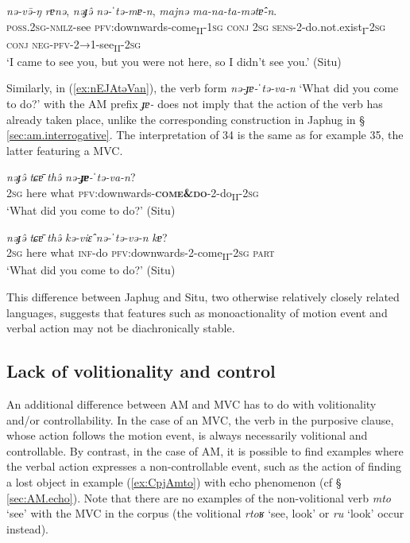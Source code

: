 \documentclass[oneside,a4paper,11pt]{article}
\newcommand{\ipa}[1]{{\phon\textit{#1}}}
\newcommand{\japhug}[2]{\textit{\phon#1} `#2'}
\newcommand{\sens}[1]{‘#1’}
\newcommand{\rouge}[1]{\textbf{#1}}
\begin{document}
\begin{exe}
\ex  \label{ex:nEkEnatso}
\gll \ipa{nə-kə-natsō} \ipa{nə-və̄-ŋ} \ipa{rɐnə}, \ipa{nəɟə̂} \ipa{nə-ˈtə-mɐ-n}, \ipa{majnə} \ipa{ma-na-ta-mətɐ̂-n}.\\
\textsc{poss.2sg}-\textsc{nmlz}-see \textsc{pfv}:downwards-come\textsubscript{II}-\textsc{1sg} \textsc{conj} \textsc{2sg} \textsc{sens}-2-do.not.exist\textsubscript{I}-\textsc{2sg} \textsc{conj} \textsc{neg}-\textsc{pfv}-2→1-see\textsubscript{II}-\textsc{2sg}\\
\glt  \sens{I came to see you, but you were not here, so I didn't see you.} (Situ)
\end{exe}

Similarly, in (\ref{ex:nEJAtəVan}), the verb form  \ipa{nə-ɟɐ-ˈtə-va-n}  \sens{What did you come to do?} with the AM prefix \ipa{ɟɐ-} does not imply that the action of the verb has already taken place, unlike the corresponding construction in Japhug in § \ref{sec:am.interrogative}.  The interpretation of 34 is the same as for example 35, the latter featuring a MVC.

 

\begin{exe}
\ex \label{ex:nEJAtəVan}
\gll
\ipa{nəɟə̂} \ipa{tɕɐ̄} \ipa{thə̂} \ipa{nə-\rouge{ɟɐ}-ˈtə-va-n}? \\
\textsc{2sg} here what  \textsc{pfv}:downwards-\textsc{\rouge{come\&do}}-2-do\textsubscript{II}-\textsc{2sg} \\
\glt  \sens{What did you come to do?} (Situ)
\end{exe}

\begin{exe}
\ex \label{ex:nEtEvEn}
\gll
\ipa{nəɟə̂} \ipa{tɕɐ̄} \ipa{thə̂} \ipa{kə-viɛ̂} \ipa{nə-ˈtə-və-n} \ipa{kɐ}? \\
\textsc{2sg} here what \textsc{inf}-do \textsc{pfv}:downwards-2-come\textsubscript{II}-\textsc{2sg} \textsc{part} \\
\glt  \sens{What did you come to do?} (Situ)
\end{exe}

This difference between Japhug and Situ, two otherwise relatively closely related languages, suggests that features such as monoactionality of motion event and verbal action may not be diachronically stable.

\subsection{Lack of volitionality and control } \label{sec:volitionality}
An additional difference between AM and MVC has to do with volitionality and/or controllability. In the case of an MVC, the verb in the purposive clause, whose action follows the motion event, is always necessarily volitional and controllable. By contrast, in the case of AM, it is possible to find examples where the verbal action expresses a non-controllable event, such as the action of finding a lost object in example (\ref{ex:CpjAmto}) with echo phenomenon (cf § \ref{sec:AM.echo}). Note that there are no examples of the non-volitional verb \japhug{mto}{see} with the MVC in the corpus (the volitional \japhug{rtoʁ}{see, look} or \japhug{ru}{look} occur  instead). 
\end{document}
